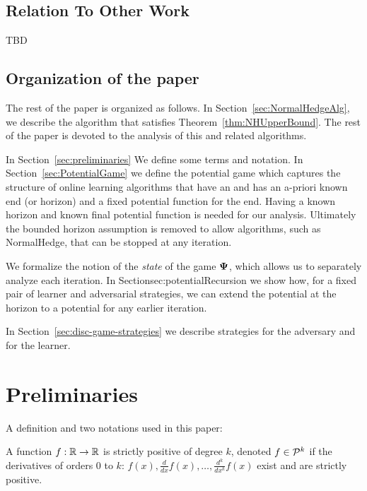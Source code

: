 \documentclass[anon,12pt]{colt2024} %
\begin{document}
\subsection{Relation To Other Work}

TBD

\subsection{Organization of the paper}
The rest of the paper is organized as follows. In
Section~\ref{sec:NormalHedgeAlg}, we describe the algorithm that
satisfies Theorem~\ref{thm:NHUpperBound}. The rest of the paper is
devoted to the analysis of this and related algorithms.

In Section~\ref{sec:preliminaries} We define some terms and
notation. In Section~\ref{sec:PotentialGame} we define the potential
game which captures the structure of online learning algorithms that
have an and has an a-priori known end (or horizon) and a fixed
potential function for the end.  Having a known horizon and known
final potential function is needed for our analysis. Ultimately the
bounded horizon assumption is removed to allow algorithms, such as
NormalHedge, that can be stopped at any iteration.

We formalize the notion of the {\em state} of the game ${\bf \Psi}$, which
allows us to separately analyze each iteration. In
Section{sec:potentialRecursion} we show how, for a fixed pair of
learner and adversarial strategies, we can extend the potential at the
horizon to a potential for any earlier iteration.

In Section~\ref{sec:disc-game-strategies} we describe strategies for the adversary and for the learner.

\section{Preliminaries}

A definition and two notations used in this paper:
\begin{definition}
A function $f:\mathbb{R} \to \mathbb{R}$ is strictly positive of degree $k$, 
denoted $f \in {\cal P}^{k}$ if the derivatives of orders 0 to $k$:  
$f(x), \frac{d}{dx}f(x), \ldots, \frac{d^k}{dx^k}f(x)$ exist and are strictly positive.
\end{definition}
\end{document}
